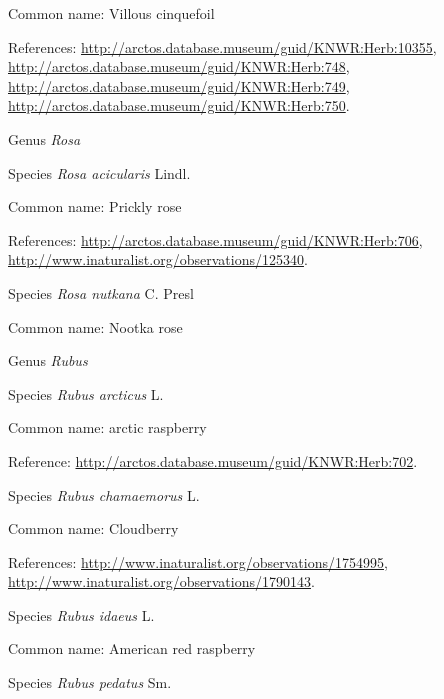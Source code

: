 \documentclass[9pt, article]{memoir}
\begin{document}
\begin{multicols}{2}
Common name: Villous cinquefoil

References: 
\url{http://arctos.database.museum/guid/KNWR:Herb:10355}, 
\url{http://arctos.database.museum/guid/KNWR:Herb:748}, 
\url{http://arctos.database.museum/guid/KNWR:Herb:749}, 
\url{http://arctos.database.museum/guid/KNWR:Herb:750}.

\vspace{6pt}\noindent\hspace{30pt}Genus \textit{Rosa}


\vspace{6pt}\noindent\hspace{36pt}Species \textit{Rosa acicularis} Lindl.


Common name: Prickly rose

References: 
\url{http://arctos.database.museum/guid/KNWR:Herb:706}, 
\url{http://www.inaturalist.org/observations/125340}.

\vspace{6pt}\noindent\hspace{36pt}Species \textit{Rosa nutkana} C. Presl


Common name: Nootka rose

\vspace{6pt}\noindent\hspace{30pt}Genus \textit{Rubus}


\vspace{6pt}\noindent\hspace{36pt}Species \textit{Rubus arcticus} L.


Common name: arctic raspberry

Reference: 
\url{http://arctos.database.museum/guid/KNWR:Herb:702}.

\vspace{6pt}\noindent\hspace{36pt}Species \textit{Rubus chamaemorus} L.


Common name: Cloudberry

References: 
\url{http://www.inaturalist.org/observations/1754995}, 
\url{http://www.inaturalist.org/observations/1790143}.

\vspace{6pt}\noindent\hspace{36pt}Species \textit{Rubus idaeus} L.


Common name: American red raspberry

\vspace{6pt}\noindent\hspace{36pt}Species \textit{Rubus pedatus} Sm.



\end{multicols}
\end{document}
